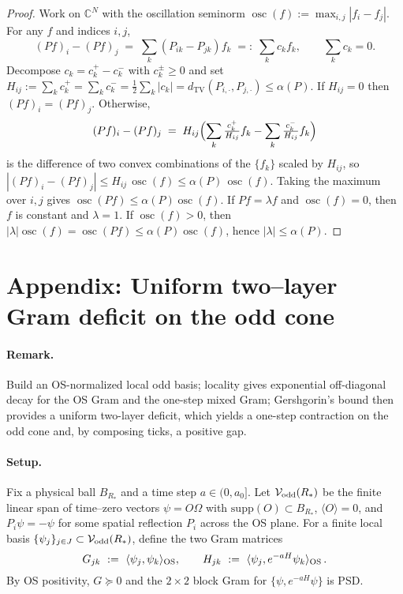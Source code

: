 \documentclass[11pt]{amsart}
\begin{document}
\begin{proof}
Work on $\mathbb{C}^N$ with the oscillation seminorm $\operatorname{osc}(f):=\max_{i,j}|f_i-f_j|$. For any $f$ and indices $i,j$,
\[
  (Pf)_i-(Pf)_j\;=\;\sum_k (P_{ik}-P_{jk}) f_k\;=:\;\sum_k c_k f_k,\qquad \sum_k c_k=0.
\]
Decompose $c_k=c_k^+-c_k^-$ with $c_k^\pm\ge 0$ and set $H_{ij}:=\sum_k c_k^+=\sum_k c_k^- = \tfrac12\sum_k |c_k| = d_{\mathrm{TV}}(P_{i,\cdot},P_{j,\cdot})\le \alpha(P)$. If $H_{ij}=0$ then $(Pf)_i=(Pf)_j$. Otherwise,
\[
  (Pf)_i-(Pf)_j\;=\;H_{ij}\Bigl(\sum_k \tfrac{c_k^+}{H_{ij}} f_k - \sum_k \tfrac{c_k^-}{H_{ij}} f_k\Bigr)
\]
is the difference of two convex combinations of the $\{f_k\}$ scaled by $H_{ij}$, so $|(Pf)_i-(Pf)_j|\le H_{ij}\,\operatorname{osc}(f)\le \alpha(P)\,\operatorname{osc}(f)$. Taking the maximum over $i,j$ gives $\operatorname{osc}(Pf)\le \alpha(P)\operatorname{osc}(f)$. If $Pf=\lambda f$ and $\operatorname{osc}(f)=0$, then $f$ is constant and $\lambda=1$. If $\operatorname{osc}(f)>0$, then $|\lambda|\operatorname{osc}(f)=\operatorname{osc}(Pf)\le \alpha(P)\operatorname{osc}(f)$, hence $|\lambda|\le \alpha(P)$.
\end{proof}

\section{Appendix: Uniform two--layer Gram deficit on the odd cone}

\paragraph{Remark.} Build an OS-normalized local odd basis; locality gives exponential off-diagonal decay for the OS Gram and the one-step mixed Gram; Gershgorin's bound then provides a uniform two-layer deficit, which yields a one-step contraction on the odd cone and, by composing ticks, a positive gap.

\paragraph{Setup.}
Fix a physical ball $B_{R_*}$ and a time step $a\in(0,a_0]$. Let $\mathcal{V}_{\rm odd}(R_*)$ be the finite linear span of time--zero vectors $\psi=O\Omega$ with $\mathrm{supp}(O)\subset B_{R_*}$, $\langle O\rangle=0$, and $P_i\psi=-\psi$ for some spatial reflection $P_i$ across the OS plane. For a finite local basis $\{\psi_j\}_{j\in J}\subset \mathcal{V}_{\rm odd}(R_*)$, define the two Gram matrices
\[
  G_{jk}\ :=\ \langle\psi_j,\psi_k\rangle_{\rm OS},\qquad
  H_{jk}\ :=\ \langle\psi_j, e^{-aH}\psi_k\rangle_{\rm OS}\,.
\]
By OS positivity, $G\succeq 0$ and the $2\times 2$ block Gram for $\{\psi, e^{-aH}\psi\}$ is PSD.
\end{document}
